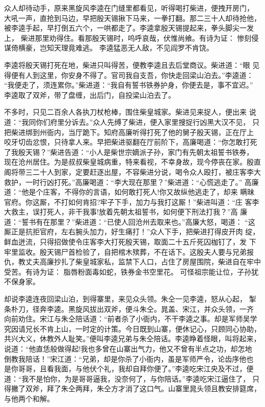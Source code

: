 众人却待动手，原来黑旋风李逵在门缝里都看见，听得喝打柴进，便拽开房门，
大吼一声，直抢到马边，早把殷天锡揪下马来，一拳打翻。那二三十人却待抢他，
被李逵手起，早打倒五六个，一哄都走了。李逵拿殷天锡提起来，拳头脚尖一发上，
柴进那里劝得住。看那殷天锡时，呜呼哀哉，伏惟尚飨。有诗为证：
惨刻侵谋倚横豪，岂知天理竟难逃。
李逵猛恶无人敌，不见阎罗不肯饶。

李逵将殷天锡打死在地，柴进只叫得苦，便教李逵且去后堂商议。柴进道：“眼
见得便有人到这里，你安身不得了。官司我自支吾，你快走回梁山泊去。”李逵道：
“我便走了，须连累你。”柴进道：“我自有誓书铁券护身，你便去是，事不宜迟。”
李逵取了双斧，带了盘缠，出后门，自投梁山泊去了。

不多时，只见二百余人各执刀杖枪棒，围住柴皇城家。柴进见来捉人，便出来
说道：“我同你们府里分诉去。”众人先缚了柴进，便入家里搜捉行凶黑大汉不见，
只把柴进绑到州衙内，当厅跪下。知府高廉听得打死了他的舅子殷天锡，正在厅上
咬牙切齿忿恨，只待拿人来。早把柴进驱翻在厅前阶下，高廉喝道：“你怎敢打死
了我殷天锡？”柴进告道：“小人是柴世宗嫡派子孙，家门有先朝太祖誓书铁券，
现在沧州居住。为是叔叔柴皇城病重，特来看视，不幸身故，现今停丧在家。殷直
阁将带三二十人到家，定要赶逐出屋，不容柴进分说，喝令众人殴打，被庄客李大
救护，一时行凶打死。”高廉喝道：“李大现在那里？”柴进道：“心慌逃走了。”
高廉道：“他是个庄客，不得你的言语，如何敢打死人!你又故纵他逃走了，却来
瞒昧官府。你这厮，不打如何肯招?牢子下手，加力与我打这厮！”柴进叫道：“庄
客李大救主，误打死人，非干我事!放着先朝太祖誓书，如何便下刑法打我？”高
廉道：“誓书有在那里？”柴进道：“已使人回沧州去取来也。”高廉大怒，喝道：
“这厮正是抗拒官府，左右腕头加力，好生痛打！”众人下手，把柴进打得皮开肉
绽，鲜血迸流，只得招做使令庄客李大打死殷天锡，取面二十五斤死囚枷钉了，发
下牢里监收。殷天锡尸首检验了，自把棺木殡葬，不在话下。这殷夫人要与兄弟报
仇，教丈夫高廉抄扎了柴皇城家私，监禁下人口，占住了房屋围院，柴进自在牢中
受苦。有诗为证：
脂唇粉面毒如蛇，铁券金书空里花。
可怪祖宗能让位，子孙犹不保身家。

却说李逵连夜回梁山泊，到得寨里，来见众头领。朱仝一见李逵，怒从心起，
掣条朴刀，径奔李逵。黑旋风拔出双斧，便斗朱仝。晁盖、宋江，并众头领，一齐
向前劝住。宋江与朱仝陪话道：“前者杀了小衙内，不干李逵之事。却是军师吴学
究因请兄长不肯上山，一时定的计策。今日既到山寨，便休记心，只顾同心协助，
共兴大义，休教外人耻笑。”便叫李逵兄弟与朱仝陪话。李逵睁着怪眼，叫将起来，
说道：“他直恁般做得起!我也多曾在山寨出气力，他又不曾有半点之功，却怎地
倒教我陪话！”宋江道：“兄弟，却是你杀了小衙内，虽是军师严令，论齿序他也
是你哥哥，且看我面，与他伏个礼，我却自拜你便了。”李逵吃宋江央及不过，便
道：“我不是怕你，为是哥哥逼我，没奈何了，与你陪话。”李逵吃宋江逼住了，
只得撇了双斧，拜了朱仝两拜，朱仝方才消了这口气。山寨里晁头领且教安排筵席，
与他两个和解。


